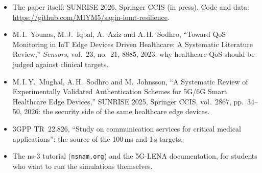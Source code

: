 \documentclass[11pt,a4paper]{article}
\begin{document}
\begin{itemize}
\item The paper itself: SUNRISE 2026, Springer CCIS (in press). Code and data:\\ \url{https://github.com/MIYM5/sagin-iomt-resilience}.
\item M.\,I.\ Younas, M.\,J.\ Iqbal, A.\ Aziz and A.\,H.\ Sodhro, ``Toward QoS Monitoring in IoT Edge Devices Driven Healthcare: A Systematic Literature Review,'' \emph{Sensors}, vol.~23, no.~21, 8885, 2023: why healthcare QoS should be judged against clinical targets.
\item M.\,I.\,Y.\ Mughal, A.\,H.\ Sodhro and M.\ Johnsson, ``A Systematic Review of Experimentally Validated Authentication Schemes for 5G/6G Smart Healthcare Edge Devices,'' SUNRISE 2025, Springer CCIS, vol.~2867, pp.~34--50, 2026: the security side of the same healthcare edge devices.
\item 3GPP TR~22.826, ``Study on communication services for critical medical applications'': the source of the 100\,ms and 1\,s targets.
\item The ns-3 tutorial (\texttt{nsnam.org}) and the 5G-LENA documentation, for students who want to run the simulations themselves.
\end{itemize}
\end{document}
